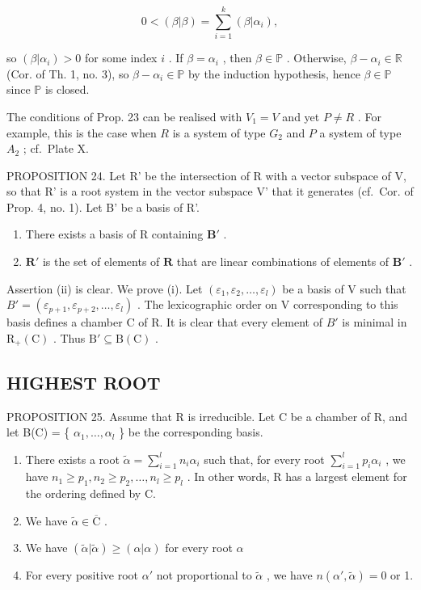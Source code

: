 \[
0 <   (\beta | \beta) = \sum_ {i = 1} ^ {k} (\beta | \alpha_ {i}),
\]

so \((\beta |\alpha_{i}) > 0\) for some index \(i\) . If \(\beta = \alpha_{i}\) , then \(\beta \in \mathbb{P}\) . Otherwise, \(\beta - \alpha_{i} \in \mathbb{R}\) (Cor. of Th. 1, no. 3), so \(\beta - \alpha_{i} \in \mathbb{P}\) by the induction hypothesis, hence \(\beta \in \mathbb{P}\) since \(\mathbb{P}\) is closed.

The conditions of Prop. 23 can be realised with \(V_{1} = V\) and yet \(P \neq R\) . For example, this is the case when \(R\) is a system of type \(G_{2}\) and \(P\) a system of type \(A_{2}\) ; cf.~Plate X.

PROPOSITION 24. Let R' be the intersection of R with a vector subspace of V, so that R' is a root system in the vector subspace V' that it generates (cf.~Cor. of Prop. 4, no. 1). Let B' be a basis of R'.

\begin{enumerate}
\def\labelenumi{(\roman{enumi})}
\item
  There exists a basis of R containing \(\mathbf{B}'\) .
\item
  \(\mathbf{R}'\) is the set of elements of \(\mathbf{R}\) that are linear combinations of elements of \(\mathbf{B}'\) .
\end{enumerate}

Assertion (ii) is clear. We prove (i). Let \((\varepsilon_{1},\varepsilon_{2},\ldots,\varepsilon_{l})\) be a basis of V such that \(B' = (\varepsilon_{p+1},\varepsilon_{p+2},\ldots,\varepsilon_{l})\) . The lexicographic order on V corresponding to this basis defines a chamber C of R. It is clear that every element of \(B'\) is minimal in \(\mathrm{R}_{+}(\mathrm{C})\) . Thus \(\mathrm{B}' \subseteq \mathrm{B}(\mathrm{C})\) .

\subsection{HIGHEST ROOT}

PROPOSITION 25. Assume that R is irreducible. Let C be a chamber of R, and let B(C) = \{ \(\alpha_{1}, \ldots, \alpha_{l}\) \} be the corresponding basis.

\begin{enumerate}
\def\labelenumi{(\roman{enumi})}
\item
  There exists a root \(\tilde{\alpha} = \sum_{i=1}^{l} n_i \alpha_i\) such that, for every root \(\sum_{i=1}^{l} p_i \alpha_i\) , we have \(n_1 \geqslant p_1, n_2 \geqslant p_2, \ldots, n_l \geqslant p_l\) . In other words, R has a largest element for the ordering defined by C.
\item
  We have \(\tilde{\alpha} \in \overline{\mathrm{C}}\) .
\item
  We have \((\tilde{\alpha}|\tilde{\alpha})\geqslant (\alpha |\alpha)\) for every root \(\alpha\)
\item
  For every positive root \(\alpha'\) not proportional to \(\tilde{\alpha}\) , we have \(n(\alpha', \tilde{\alpha}) = 0\) or 1.
\end{enumerate}

